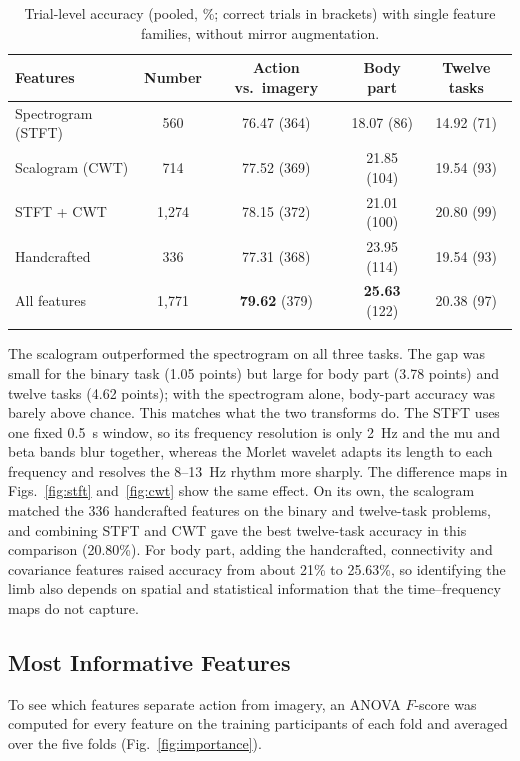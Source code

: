 \documentclass[pdflatex,sn-mathphys-num]{sn-jnl}%
\theoremstyle{thmstyleone}%
\theoremstyle{thmstyletwo}%
\theoremstyle{thmstylethree}%
\begin{document}
\begin{table}[htbp]
\centering
\caption{Trial-level accuracy (pooled, \%; correct trials in brackets) with single feature families, without mirror augmentation.}
\label{tab:families}
\footnotesize
\begin{tabular}{@{}lcccc@{}}
\toprule
\textbf{Features} & \textbf{Number} & \textbf{Action vs.\ imagery} & \textbf{Body part} & \textbf{Twelve tasks} \\
\midrule
Spectrogram (STFT) & 560 & 76.47 (364) & 18.07 (86) & 14.92 (71) \\
Scalogram (CWT) & 714 & 77.52 (369) & 21.85 (104) & 19.54 (93) \\
STFT + CWT & 1,274 & 78.15 (372) & 21.01 (100) & 20.80 (99) \\
Handcrafted & 336 & 77.31 (368) & 23.95 (114) & 19.54 (93) \\
All features & 1,771 & \textbf{79.62} (379) & \textbf{25.63} (122) & 20.38 (97) \\
\botrule
\end{tabular}
\end{table}

The scalogram outperformed the spectrogram on all three tasks. The gap was small for the binary task (1.05 points) but large for body part (3.78 points) and twelve tasks (4.62 points); with the spectrogram alone, body-part accuracy was barely above chance. This matches what the two transforms do. The STFT uses one fixed 0.5~s window, so its frequency resolution is only 2~Hz and the mu and beta bands blur together, whereas the Morlet wavelet adapts its length to each frequency and resolves the 8--13~Hz rhythm more sharply. The difference maps in Figs.~\ref{fig:stft} and~\ref{fig:cwt} show the same effect. On its own, the scalogram matched the 336 handcrafted features on the binary and twelve-task problems, and combining STFT and CWT gave the best twelve-task accuracy in this comparison (20.80\%). For body part, adding the handcrafted, connectivity and covariance features raised accuracy from about 21\% to 25.63\%, so identifying the limb also depends on spatial and statistical information that the time--frequency maps do not capture.

\subsection{Most Informative Features}\label{subsec:importance}

To see which features separate action from imagery, an ANOVA $F$-score was computed for every feature on the training participants of each fold and averaged over the five folds (Fig.~\ref{fig:importance}).
\end{document}
